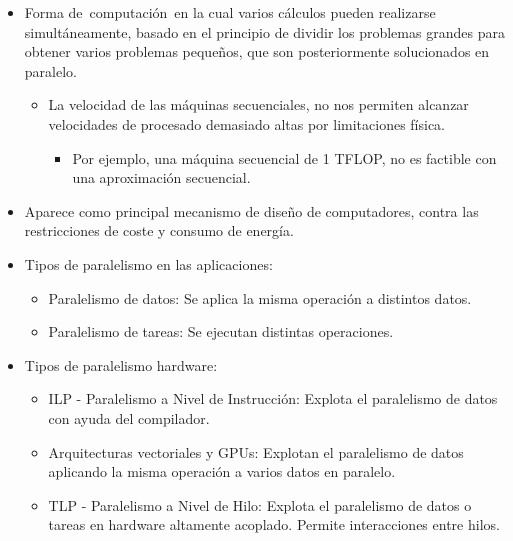 \documentclass[12pt, twoside, openright]{report} %
\begin{document}
  \begin{itemize}
  
  \item
    Forma de~computación~en la cual varios cálculos pueden realizarse
    simultáneamente, basado en el principio de dividir los problemas
    grandes para obtener varios problemas pequeños, que son
    posteriormente solucionados en paralelo.

    \begin{itemize}
    
    \item
      La velocidad de las máquinas secuenciales, no nos permiten
      alcanzar velocidades de procesado demasiado altas por limitaciones
      física.

      \begin{itemize}
      
      \item
        Por ejemplo, una máquina secuencial de 1 TFLOP, no es factible
        con una aproximación secuencial.
      \end{itemize}
    \end{itemize}
    \pagebreak
  \item
    Aparece como principal mecanismo de diseño de computadores, contra
    las restricciones de coste y consumo de energía.
  \item
    Tipos de paralelismo en las aplicaciones:

    \begin{itemize}
    
    \item
      Paralelismo de datos: Se aplica la misma operación a distintos
      datos.
    \item
      Paralelismo de tareas: Se ejecutan distintas operaciones.
    \end{itemize}
  \item
    Tipos de paralelismo hardware:

    \begin{itemize}
    
    \item
      ILP - Paralelismo a Nivel de Instrucción: Explota el paralelismo
      de datos con ayuda del compilador.
    \item
      Arquitecturas vectoriales y GPUs: Explotan el paralelismo de datos
      aplicando la misma operación a varios datos en paralelo.
    \item
      TLP - Paralelismo a Nivel de Hilo: Explota el paralelismo de datos
      o tareas en hardware altamente acoplado. Permite interacciones
      entre hilos.


\end{itemize}
\end{itemize}
\end{document}
